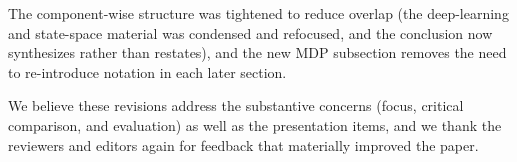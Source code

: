 \documentclass[11pt]{article}
\begin{document}
The component-wise structure was tightened to reduce overlap (the deep-learning
and state-space material was condensed and refocused, and the conclusion now
synthesizes rather than restates), and the new MDP subsection removes the need
to re-introduce notation in each later section.

\bigskip

\noindent We believe these revisions address the substantive concerns (focus,
critical comparison, and evaluation) as well as the presentation items, and we
thank the reviewers and editors again for feedback that materially improved the
paper.
\end{document}
